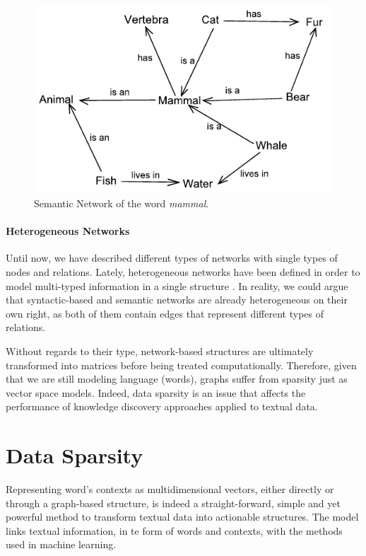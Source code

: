 \begin{figure}[!h]
\centering
\includegraphics[width=0.7\linewidth]{images/Chapitre2/sem_net.pdf}
\caption{Semantic Network of the word \textit{mammal}.}
\label{fig:sem_net}
\end{figure}


\paragraph{Heterogeneous Networks}
Until now, we have described different types of networks with single types of nodes and relations. Lately, heterogeneous networks have been defined in order to model multi-typed information in a single structure \cite{Jiawei2009}. In reality, we could argue that syntactic-based and semantic networks are already heterogeneous on their own right, as both of them contain edges that represent different types of relations.



Without regards to their type, network-based structures are ultimately transformed into matrices before being treated computationally. Therefore, given that we are still modeling language (words), graphs suffer from sparsity just as vector space models. Indeed, data sparsity is an issue that affects the performance of knowledge discovery approaches \cite{mining12Book,PerinetH15} applied to textual data.

\section{Data Sparsity}
Representing word's contexts as multidimensional  vectors, either directly or through a graph-based structure, is indeed a straight-forward, simple and  yet powerful method to transform textual data into actionable structures. The model links  textual information, in te form of words and contexts, with the methods used in machine learning.

